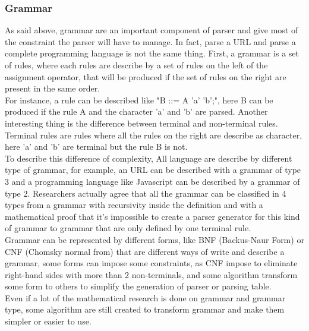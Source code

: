 \subsubsection{Grammar}
As said above, grammar are an important component of parser and give most of the constraint the parser will have to manage. In fact, parse a URL and parse a complete programming language is not the same thing. First, a grammar is a set of rules, where each rules are describe by a set of rules on the left of the assignment operator, that will be produced if the set of rules on the right are present in the same order.\\
For instance, a rule can be described like "B ::= A 'a' 'b';", here B can be produced if the rule A and the character 'a' and 'b' are parsed. Another interesting thing is the difference between terminal and non-terminal rules. Terminal rules are rules where all the rules on the right are describe as character, here 'a' and 'b' are terminal but the rule B is not.\\
To describe this difference of complexity, All language are describe by different type of grammar, for example, an URL can be described with a grammar of type 3 and a programming language like Javascript can be described by a grammar of type 2. Researchers actually agree that all the grammar can be classified in 4 types from a grammar with recursivity inside the definition and with a mathematical proof that it's impossible to create a parser generator for this kind of grammar to grammar that are only defined by one terminal rule.\\
Grammar can be represented by different forms, like BNF (Backus-Naur Form) or CNF (Chomsky normal from) that are different ways of write and describe a grammar, some forms can impose some constraints, as CNF impose to eliminate right-hand sides with more than 2 non-terminals, and some algorithm transform some form to others to simplify the generation of parser or parsing table.\\
Even if a lot of the mathematical research is done on grammar and grammar type, some algorithm are still created to transform grammar and make them simpler or easier to use.

